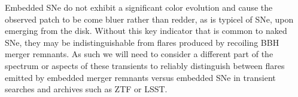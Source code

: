 Embedded SNe do not exhibit a significant color evolution and cause the observed patch to be come bluer rather than redder, as is typicel of SNe, upon emerging from the disk.
Without this key indicator that is common to naked SNe, they may be indistinguishable from flares produced by recoiling BBH merger remnants.
As such we will need to consider a different part of the spectrum or aspects of these transients to reliably distinguish between flares emitted by embedded merger remnants versus embedded SNe in transient searches and archives such as ZTF or LSST.
